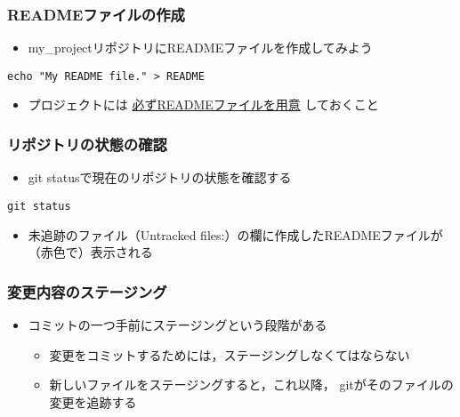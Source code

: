 \documentclass[a4paper,twoside,twocolumn]{bxjsarticle}
\begin{document}
\subsubsection{READMEファイルの作成}
\label{sec-1-3-2}
\begin{itemize}
\item my\_projectリポジトリにREADMEファイルを作成してみよう
\end{itemize}

\begin{verbatim}
echo "My README file." > README
\end{verbatim}

\begin{itemize}
\item プロジェクトには \uline{必ずREADMEファイルを用意} しておくこと
\end{itemize}

\subsubsection{リポジトリの状態の確認}
\label{sec-1-3-3}
\begin{itemize}
\item git statusで現在のリポジトリの状態を確認する
\end{itemize}

\begin{verbatim}
git status
\end{verbatim}

\begin{itemize}
\item 未追跡のファイル（Untracked files:）の欄に作成したREADMEファイルが
（赤色で）表示される
\end{itemize}

\subsubsection{変更内容のステージング}
\label{sec-1-3-4}
\begin{itemize}
\item コミットの一つ手前にステージングという段階がある
\begin{itemize}
\item 変更をコミットするためには，ステージングしなくてはならない
\item 新しいファイルをステージングすると，これ以降，
gitがそのファイルの変更を追跡する
\end{itemize}
\end{itemize}
\end{document}
